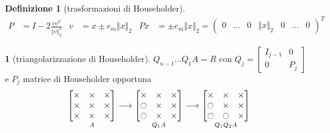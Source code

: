 \documentclass[a4paper,10pt]{article}
\theoremstyle{definition}
\theoremstyle{indentdefinition}
\newtheorem{defn}{Definizione}[section]
\theoremstyle{indenttheorem}
\theoremstyle{myremark}
\theoremstyle{indentgeneral}
\newtheorem{lyxalgorithm}[thm]{\protect\algorithmname}
\theoremstyle{plain}
\theoremstyle{plain}
\begin{document}
\begin{defn}[trasformazioni di Householder]
\begin{align*}
P & =I-2\frac{vv^{T}}{\left\Vert v\right\Vert _{2}^{2}} & v & =x\pm e_{m}\left\Vert x\right\Vert _{2} & Px & =\pm e_{m}\left\Vert x\right\Vert _{2}=\begin{pmatrix}0 & \ldots & 0 & \left\Vert x\right\Vert _{2} & 0 & \ldots & 0\end{pmatrix}^{T}
\end{align*}
\end{defn}

\begin{lyxalgorithm}[triangolarizzazione di Householder]
$Q_{n-1}\ldots Q_{1}A=R$ con $Q_{j}=\begin{bmatrix}I_{j-1} & 0\\
0 & P_{j}
\end{bmatrix}$ e $P_{j}$ matrice di Householder opportuna
\[
\underset{A}{\begin{bmatrix}\times & \times & \times\\
\times & \times & \times\\
\times & \times & \times
\end{bmatrix}}\longrightarrow\underset{Q_{1}A}{\begin{bmatrix}\times & \times & \times\\
\ocircle & \times & \times\\
\ocircle & \times & \times
\end{bmatrix}}\longrightarrow\underset{Q_{1}Q_{2}A}{\begin{bmatrix}\times & \times & \times\\
\ocircle & \times & \times\\
\ocircle & \ocircle & \times
\end{bmatrix}}
\]
\end{lyxalgorithm}
\end{document}
